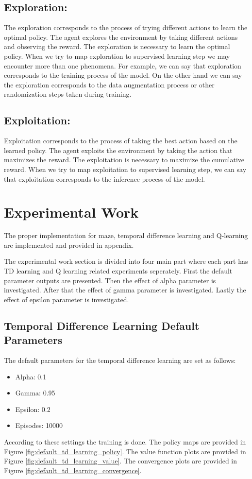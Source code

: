 \documentclass{assignment}
\begin{document}
\subsection{Exploration: }
The exploration corresponds to the process of trying different actions to learn the optimal policy. The agent explores the environment by taking different actions and observing the reward. The exploration is necessary to learn the optimal policy. When we try to map exploration to supervised learning step we may encounter more than one phenomena. For example, we can say that exploration corresponds to the training process of the model. On the other hand we can say the exploration corresponds to the data augmentation process or other randomization steps taken during training.

\subsection{Exploitation: }
Exploitation corresponds to the process of taking the best action based on the learned policy. The agent exploits the environment by taking the action that maximizes the reward. The exploitation is necessary to maximize the cumulative reward. When we try to map exploitation to supervised learning step, we can say that exploitation corresponds to the inference process of the model. 

\section{Experimental Work}
The proper implementation for maze, temporal difference learning and Q-learning are implemented and provided in appendix. 

\noindent The experimental work section is divided into four main part where each part has TD learning and Q learning related experiments seperately. First the default parameter outputs are presented. Then the effect of alpha parameter is investigated. After that the effect of gamma parameter is investigated. Lastly the effect of epsilon parameter is investigated.
\subsection{Temporal Difference Learning Default Parameters}
The default parameters for the temporal difference learning are set as follows:
\begin{itemize}
    \item Alpha: 0.1
    \item Gamma: 0.95
    \item Epsilon: 0.2
    \item Episodes: 10000
\end{itemize}
According to these settings the training is done. The policy maps are provided  in Figure \ref{fig:default_td_learning_policy}. The value function plots are provided in Figure \ref{fig:default_td_learning_value}. The convergence plots are provided in Figure \ref{fig:default_td_learning_convergence}.
\end{document}
